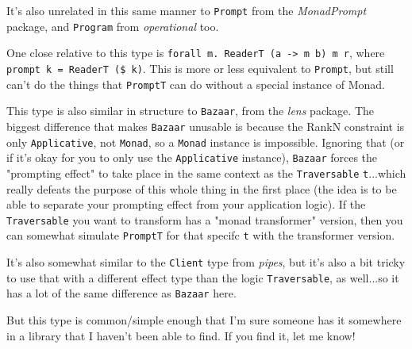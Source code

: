 \documentclass[]{article}
\begin{document}
It's also unrelated in this same manner to \texttt{Prompt} from the
\emph{MonadPrompt} package, and \texttt{Program} from \emph{operational} too.

One close relative to this type is
\texttt{forall\ m.\ ReaderT\ (a\ -\textgreater{}\ m\ b)\ m\ r}, where
\texttt{prompt\ k\ =\ ReaderT\ (\$\ k)}. This is more or less equivalent to
\texttt{Prompt}, but still can't do the things that \texttt{PromptT} can do
without a special instance of Monad.

This type is also similar in structure to \texttt{Bazaar}, from the \emph{lens}
package. The biggest difference that makes \texttt{Bazaar} unusable is because
the RankN constraint is only \texttt{Applicative}, not \texttt{Monad}, so a
\texttt{Monad} instance is impossible. Ignoring that (or if it's okay for you to
only use the \texttt{Applicative} instance), \texttt{Bazaar} forces the
"prompting effect" to take place in the same context as the \texttt{Traversable}
\texttt{t}...which really defeats the purpose of this whole thing in the first
place (the idea is to be able to separate your prompting effect from your
application logic). If the \texttt{Traversable} you want to transform has a
"monad transformer" version, then you can somewhat simulate \texttt{PromptT} for
that specifc \texttt{t} with the transformer version.

It's also somewhat similar to the \texttt{Client} type from \emph{pipes}, but
it's also a bit tricky to use that with a different effect type than the logic
\texttt{Traversable}, as well...so it has a lot of the same difference as
\texttt{Bazaar} here.

But this type is common/simple enough that I'm sure someone has it somewhere in
a library that I haven't been able to find. If you find it, let me know!
\end{document}
